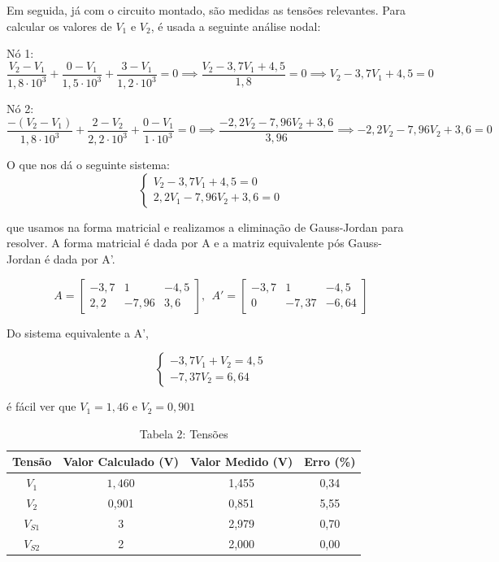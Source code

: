 \documentclass[a4 paper]{article}
\begin{document}
Em seguida, já com o circuito montado, são medidas as tensões relevantes. Para calcular os valores de $V_1$ e $V_2$, é usada a seguinte análise nodal:

\noindent Nó 1:
\[\frac{V_2-V_1}{1,8\cdot10^3}+\frac{0-V_1}{1,5\cdot10^3}+\frac{3-V_1}{1,2\cdot10^3}=0 \implies \frac{V_2-3,7V_1+4,5}{1,8}=0 \implies V_2-3,7V_1+4,5=0\]

\noindent Nó 2:
\[\frac{-(V_2-V_1)}{1,8\cdot10^3}+\frac{2-V_2}{2,2\cdot10^3}+\frac{0-V_1}{1\cdot10^3}=0\implies \frac{-2,2V_2-7,96V_2+3,6}{3,96}\implies-2,2V_2-7,96V_2+3,6=0 \]

\noindent O que nos dá o seguinte sistema:
\begin{equation*}
\left\{
\begin{aligned}
V_2-3,7V_1+4,5=0  \\
2,2V_1-7,96V_2+3,6=0
\end{aligned}\right.
\end{equation*}

\noindent que usamos na forma matricial e realizamos a eliminação de Gauss-Jordan para resolver. A forma matricial é dada por A e a matriz equivalente pós Gauss-Jordan é dada por A'.

\[
A=
\begin{bmatrix}
-3,7 & 1 & -4,5\\
2,2 & -7,96 & 3,6
\end{bmatrix},\ \ 
A'=
\begin{bmatrix}
-3,7 & 1 & -4,5\\
0 & -7,37 & -6,64
\end{bmatrix}
\]

\noindent Do sistema equivalente a A',

\begin{equation*}
\left\{
\begin{aligned}
-3,7V_1+V_2=4,5\\
	-7,37V_2=6,64
\end{aligned}\right.
\end{equation*}

\noindent é fácil ver que $V_1=1,46$ e $V_2=0,901$

\vspace{5pt}
\begin{table}[h]
\centering
\begin{tabular}{|c|c|c|c|}
\hline
Tensão & Valor Calculado (V) & Valor Medido (V) & Erro (\%) \\\hline
$V_1$ & $1,460$&1,455 &0,34 \\\hline
$V_2$ & 0,901&0,851 &5,55 \\\hline
$V_{S1}$ &3 &2,979 &0,70 \\\hline
$V_{S2}$ & 2&2,000 &0,00 \\\hline
\end{tabular}
\caption*{Tabela 2: Tensões}
\end{table}
\end{document}
